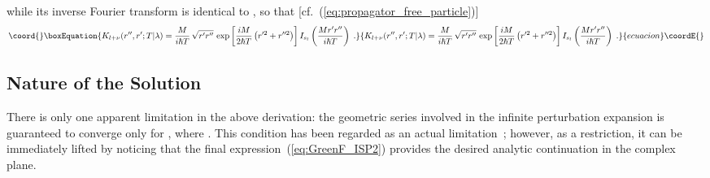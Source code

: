 \documentclass[a4paper,preprint,draft,showpacs,amsmath,amsfonts,amssymb,aps,prd]{revtex4}%
\begin{document}
while its
inverse Fourier transform %
is identical to \coordHE{}, so that
[cf.~(\ref{eq:propagator_free_particle})]
\begin{equation}\coord{}\boxEquation{
K_{l+\nu} (r'',r';T | \lambda) 
=
\frac{M}{i \hbar T} 
\,
\sqrt{ r' r''} 
\,
\exp \left[ \frac{i M}{2 \hbar T} \left(r^{\prime 2} + r^{\prime \prime 2} 
\right) \right]
I_{s_{l}} \left( \frac{Mr'r''}{i \hbar T} \right)
\; .
\label{eq:propagator_ISP}
}{
K_{l+\nu} (r'',r';T | \lambda) 
=
\frac{M}{i \hbar T} 
\,
\sqrt{ r' r''} 
\,
\exp \left[ \frac{i M}{2 \hbar T} \left(r^{\prime 2} + r^{\prime \prime 2} 
\right) \right]
I_{s_{l}} \left( \frac{Mr'r''}{i \hbar T} \right)
\; .
}{ecuacion}\coordE{}\end{equation}


\subsection{Nature of the Solution}
\label{sec:nature_of_solution}


There is only one apparent limitation in the above derivation:
the geometric series involved in the infinite perturbation 
expansion is guaranteed to converge only
for \coordHE{}, where 
\coordHE{}. 
This condition
has been regarded as an actual limitation~\cite{bha:89};
however, as a restriction, it can be 
immediately lifted by noticing that the final 
expression~(\ref{eq:GreenF_ISP2}) 
provides the desired analytic continuation in the complex \myHighlight{$\lambda$}\coordHE{} plane.
\end{document}
